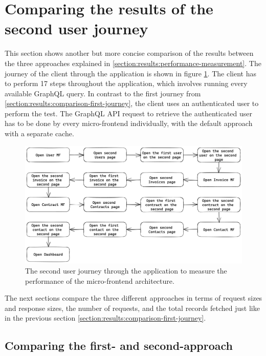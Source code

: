 \section{Comparing the results of the second user journey}\label{section:results:comparison-second-journey}

This section shows another but more concise comparison of the results between the three approaches explained in \ref{section:results:performance-measurement}. The journey of the client through the application is shown in figure \ref{fig:results:evaluation-second-path}. The client has to perform 17 steps throughout the application, which involves running every available GraphQL query. In contrast to the first journey from \ref{section:results:comparison-first-journey}, the client uses an authenticated user to perform the test. The GraphQL \ac{API} request to retrieve the authenticated user has to be done by every micro-frontend individually, with the default approach with a separate cache.

\ifshowImages
\begin{figure}[H]
\centering
\includegraphics[width=1\linewidth]{images/results/evaluation-second-path.png}
\caption{The second user journey through the application to measure the performance of the micro-frontend architecture.}\label{fig:results:evaluation-second-path}
\end{figure}
\fi

\noindent The next sections compare the three different approaches in terms of request sizes and response sizes, the number of requests, and the total records fetched just like in the previous section \ref{section:results:comparison-first-journey}.

\subsection{Comparing the first- and second-approach}\label{subsection:results:comparison-second-path-first-second-approach}


